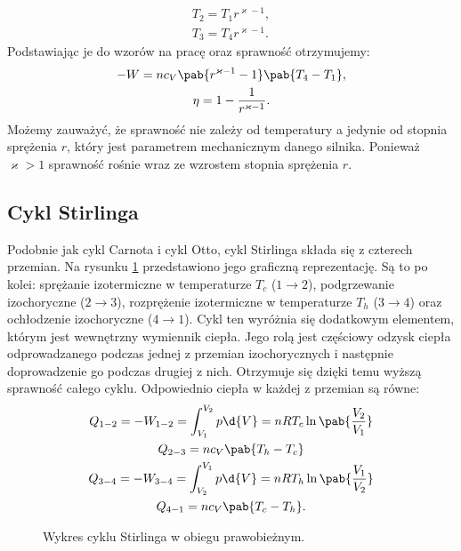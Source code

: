 \begin{gather}
	T_2 = T_1 r^{\varkappa-1}, \\
	T_3 = T_4 r^{\varkappa-1}.
\end{gather}
Podstawiając je do wzorów na pracę oraz sprawność otrzymujemy:
\begin{gather}
	- W = n c_V \pab{r^{\varkappa-1} - 1} \pab{T_4 - T_1}, \label{eq:parametry_otto_W} \\
	\eta = 1 - \inv{r^{\varkappa-1}}. \label{eq:parametry_otto_eta}
\end{gather}
Możemy zauważyć, że sprawność nie zależy od temperatury a jedynie od stopnia sprężenia \(r\), który jest parametrem mechanicznym danego silnika. Ponieważ \(\varkappa > 1\) sprawność rośnie wraz ze wzrostem stopnia sprężenia \(r\).

\subsection{Cykl Stirlinga}
Podobnie jak cykl Carnota i cykl Otto, cykl Stirlinga składa się z czterech przemian. Na rysunku \ref{fig:pv_silnik_stirling} przedstawiono jego graficzną reprezentację. Są to po kolei: sprężanie izotermiczne w temperaturze \(T_c\) (\(1 \rightarrow 2\)), podgrzewanie izochoryczne (\(2 \rightarrow 3\)), rozprężenie izotermiczne w temperaturze \(T_h\) (\(3 \rightarrow 4\)) oraz ochłodzenie izochoryczne (\(4 \rightarrow 1\)). Cykl ten wyróżnia się dodatkowym elementem, którym jest wewnętrzny wymiennik ciepła. Jego rolą jest częściowy odzysk ciepła odprowadzanego podczas jednej z przemian izochorycznych i następnie doprowadzenie go podczas drugiej z nich. Otrzymuje się dzięki temu wyższą sprawność całego cyklu. Odpowiednio ciepła w każdej z przemian są równe:
\begin{gather}
	Q_{1-2} = - W_{1-2} = \int_{V_1}^{V_2} p \d{V} = nRT_c \ln\pab{\frac{V_2}{V_1}} \\
	Q_{2-3} = n c_V \pab{T_h - T_c} \\
	Q_{3-4} = - W_{3-4} = \int_{V_2}^{V_1} p \d{V} = nRT_h \ln\pab{\frac{V_1}{V_2}} \\
	Q_{4-1} = n c_V \pab{T_c - T_h}.
\end{gather}

\begin{figure}
	\centering
	
	\caption{Wykres cyklu Stirlinga w obiegu prawobieżnym.}
	\label{fig:pv_silnik_stirling}
\end{figure}

